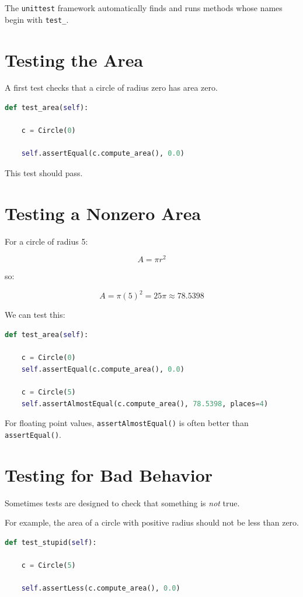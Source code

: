 \documentclass[11pt]{article}
\begin{document}
The \texttt{unittest} framework automatically finds and runs methods whose names begin with \texttt{test\_}.

\section{Testing the Area}

A first test checks that a circle of radius zero has area zero.

\begin{lstlisting}[language=Python]
def test_area(self):

    c = Circle(0)

    self.assertEqual(c.compute_area(), 0.0)
\end{lstlisting}

This test should pass.

\section{Testing a Nonzero Area}

For a circle of radius 5:

\[
A = \pi r^2
\]

so:

\[
A = \pi(5)^2 = 25\pi \approx 78.5398
\]

We can test this:

\begin{lstlisting}[language=Python]
def test_area(self):

    c = Circle(0)
    self.assertEqual(c.compute_area(), 0.0)

    c = Circle(5)
    self.assertAlmostEqual(c.compute_area(), 78.5398, places=4)
\end{lstlisting}

For floating point values, \texttt{assertAlmostEqual()} is often better than \texttt{assertEqual()}.

\section{Testing for Bad Behavior}

Sometimes tests are designed to check that something is \emph{not} true.

For example, the area of a circle with positive radius should not be less than zero.

\begin{lstlisting}[language=Python]
def test_stupid(self):

    c = Circle(5)

    self.assertLess(c.compute_area(), 0.0)
\end{lstlisting}
\end{document}
